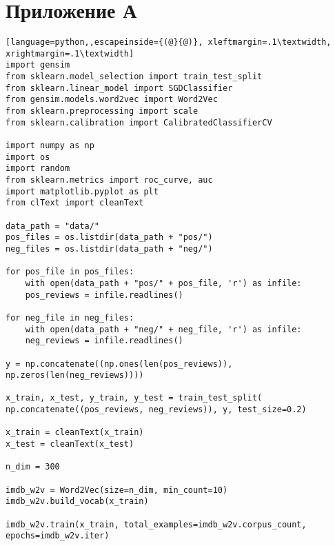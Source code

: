 \chapter{Приложение А}
\label{cha:appendix1}


\captionsetup{justification=centering}

\begin{lstlisting}[language=python,,escapeinside={(@}{@)}, xleftmargin=.1\textwidth, xrightmargin=.1\textwidth] 
import gensim
from sklearn.model_selection import train_test_split
from sklearn.linear_model import SGDClassifier
from gensim.models.word2vec import Word2Vec
from sklearn.preprocessing import scale
from sklearn.calibration import CalibratedClassifierCV

import numpy as np
import os
import random
from sklearn.metrics import roc_curve, auc
import matplotlib.pyplot as plt
from clText import cleanText

data_path = "data/"
pos_files = os.listdir(data_path + "pos/")
neg_files = os.listdir(data_path + "neg/")

for pos_file in pos_files:  
	with open(data_path + "pos/" + pos_file, 'r') as infile:
	pos_reviews = infile.readlines()

for neg_file in neg_files:
	with open(data_path + "neg/" + neg_file, 'r') as infile:
	neg_reviews = infile.readlines()

y = np.concatenate((np.ones(len(pos_reviews)), np.zeros(len(neg_reviews))))

x_train, x_test, y_train, y_test = train_test_split(
np.concatenate((pos_reviews, neg_reviews)), y, test_size=0.2)

x_train = cleanText(x_train)
x_test = cleanText(x_test)

n_dim = 300

imdb_w2v = Word2Vec(size=n_dim, min_count=10)
imdb_w2v.build_vocab(x_train)

imdb_w2v.train(x_train, total_examples=imdb_w2v.corpus_count,
epochs=imdb_w2v.iter)



\end{lstlisting}
